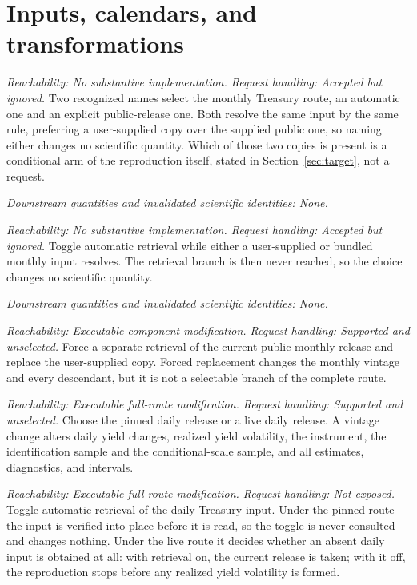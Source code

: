 \documentclass[11pt]{article}
\begin{document}
\section{Inputs, calendars, and transformations}

\begin{description}[style=nextline]
\item[Monthly Treasury route name.]
\emph{Reachability: No substantive implementation. Request handling: Accepted but ignored.}
Two recognized names select the monthly Treasury route, an automatic one and an explicit
public-release one. Both resolve the same input by the same rule, preferring a user-supplied copy
over the supplied public one, so naming either changes no scientific quantity. Which of those two
copies is present is a conditional arm of the reproduction itself, stated in
Section~\ref{sec:target}, not a request.

\emph{Downstream quantities and invalidated scientific identities: None.}

\item[Monthly automatic retrieval toggle.]
\emph{Reachability: No substantive implementation. Request handling: Accepted but ignored.}
Toggle automatic retrieval while either a user-supplied or bundled monthly input resolves. The
retrieval branch is then never reached, so the choice changes no scientific quantity.

\emph{Downstream quantities and invalidated scientific identities: None.}

\item[Forced replacement of the monthly input.]
\emph{Reachability: Executable component modification. Request handling: Supported and unselected.}
Force a separate retrieval of the current public monthly release and replace the user-supplied copy.
Forced replacement changes the monthly vintage and every descendant, but it is not a selectable branch of the
complete route.

\item[Daily Treasury source.]
\emph{Reachability: Executable full-route modification. Request handling: Supported and unselected.}
Choose the pinned daily release or a live daily release. A vintage change alters daily yield changes,
realized yield volatility, the instrument, the identification sample and the conditional-scale
sample, and all estimates, diagnostics, and intervals.

\item[Daily automatic retrieval toggle.]
\emph{Reachability: Executable full-route modification. Request handling: Not exposed.}
Toggle automatic retrieval of the daily Treasury input. Under the pinned route the input is verified
into place before it is read, so the toggle is never consulted and changes nothing. Under the live
route it decides whether an absent daily input is obtained at all: with retrieval on, the current
release is taken; with it off, the reproduction stops before any realized yield volatility is formed.


\end{description}
\end{document}
